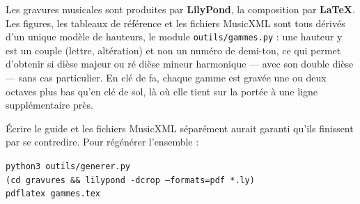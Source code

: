 \documentclass[a4paper,11pt]{article}
\begin{document}
Les gravures musicales sont produites par \textbf{LilyPond}, la composition
par \textbf{\LaTeX}. Les figures, les tableaux de référence et les fichiers
MusicXML sont tous dérivés d'un unique modèle de hauteurs, le module
\texttt{outils/gammes.py} : une hauteur y est un couple (lettre, altération)
et non un numéro de demi-ton, ce qui permet d'obtenir si dièse majeur ou ré
dièse mineur harmonique — avec son double dièse — sans cas particulier.
En clé de fa, chaque gamme est gravée une ou deux octaves plus bas qu'en clé
de sol, là où elle tient sur la portée à une ligne supplémentaire près.

Écrire le guide et les fichiers MusicXML séparément aurait garanti qu'ils
finissent par se contredire. Pour régénérer l'ensemble :

\begin{center}
\texttt{python3 outils/generer.py}\\
\texttt{(cd gravures \&\& lilypond -dcrop --formats=pdf *.ly)}\\
\texttt{pdflatex gammes.tex}
\end{center}
\end{document}
